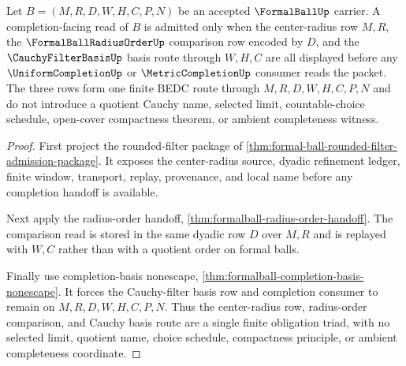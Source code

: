 \begin{theorem}
\label{thm:formalball-completion-obligation-triad}
Let $B=(M,R,D,W,H,C,P,N)$ be an accepted $\FormalBallUp$ carrier. A completion-facing read of $B$ is admitted only when the center-radius row $M,R$, the $\FormalBallRadiusOrderUp$ comparison row encoded by $D$, and the $\CauchyFilterBasisUp$ basis route through $W,H,C$ are all displayed before any $\UniformCompletionUp$ or $\MetricCompletionUp$ consumer reads the packet. The three rows form one finite BEDC route through $M,R,D,W,H,C,P,N$ and do not introduce a quotient Cauchy name, selected limit, countable-choice schedule, open-cover compactness theorem, or ambient completeness witness.
\end{theorem}
\begin{proof}
First project the rounded-filter package of \autoref{thm:formal-ball-rounded-filter-admission-package}. It exposes the center-radius source, dyadic refinement ledger, finite window, transport, replay, provenance, and local name before any completion handoff is available.

Next apply the radius-order handoff, \autoref{thm:formalball-radius-order-handoff}. The comparison read is stored in the same dyadic row $D$ over $M,R$ and is replayed with $W,C$ rather than with a quotient order on formal balls.

Finally use completion-basis nonescape, \autoref{thm:formalball-completion-basis-nonescape}. It forces the Cauchy-filter basis row and completion consumer to remain on $M,R,D,W,H,C,P,N$. Thus the center-radius row, radius-order comparison, and Cauchy basis route are a single finite obligation triad, with no selected limit, quotient name, choice schedule, compactness principle, or ambient completeness coordinate.
\end{proof}

